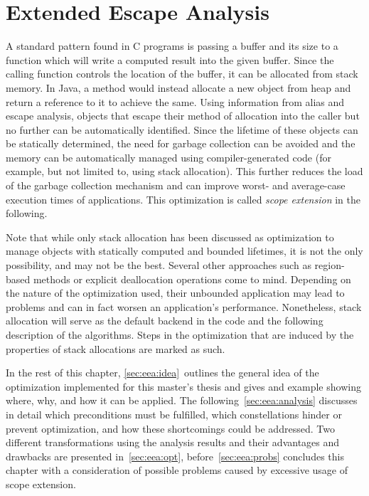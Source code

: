 
\chapter{Extended Escape Analysis}
	\label{chapter:eea}
	A standard pattern found in C programs is passing a buffer and its size to a function which will write a computed
	result into the given buffer. Since the calling function controls the location of the buffer, it can be allocated from
	stack memory. In Java, a method would instead allocate a new object from heap and return a reference to it to achieve
	the same. Using information from alias and escape analysis, objects that escape their method of allocation into the
	caller but no further can be automatically identified. Since the lifetime of these objects can be statically
	determined, the need for garbage collection can be avoided and the memory can be automatically managed using
	compiler-generated code (for example, but not limited to, using stack allocation). This further reduces the load of
	the garbage collection mechanism and can improve worst- and average-case execution times of applications. This
	optimization is called \emph{scope extension} in the following.

	Note that while only stack allocation has been discussed as optimization to manage objects with statically computed
	and bounded lifetimes, it is not the only possibility, and may not be the best. Several other approaches such as
	region-based methods or explicit deallocation operations come to mind. Depending on the nature of the optimization
	used, their unbounded application may lead to problems and can in fact worsen an application's performance.
	Nonetheless, stack allocation will serve as the default backend in the code and the following description of the
	algorithms. Steps in the optimization that are induced by the properties of stack allocations are marked as such.

	In the rest of this chapter, \cref{sec:eea:idea}~outlines the general idea of the optimization implemented for this
	master's thesis and gives and example showing where, why, and how it can be applied. The
	following~\cref{sec:eea:analysis} discusses in detail which preconditions must be fulfilled, which constellations
	hinder or prevent optimization, and how these shortcomings could be addressed. Two different transformations using the
	analysis results and their advantages and drawbacks are presented in~\cref{sec:eea:opt}, before~\cref{sec:eea:probs}
	concludes this chapter with a consideration of possible problems caused by excessive usage of scope extension.

